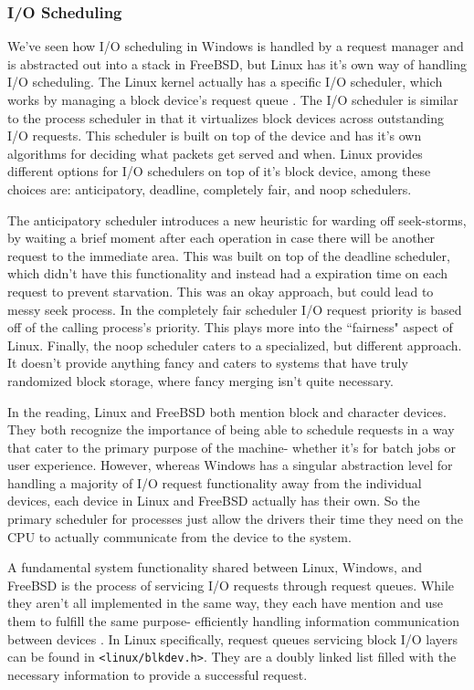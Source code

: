 \documentclass[10pt,draftclsnofoot,onecolumn]{IEEEtran}
\begin{document}
\subsubsection{I/O Scheduling}
\label{sub:IOScheduling Linux}
\par We've seen how I/O scheduling in Windows is handled by a request manager and is abstracted out into a stack in FreeBSD, but Linux has it's own way of handling I/O scheduling.
The Linux kernel actually has a specific I/O scheduler, which works by managing a block device's request queue \cite{linux:1}.
The I/O scheduler is similar to the process scheduler in that it virtualizes block devices across outstanding I/O requests.
This scheduler is built on top of the device and has it's own algorithms for deciding what packets get served and when.
Linux provides different options for I/O schedulers on top of it's block device, among these choices are: anticipatory, deadline, completely fair, and noop schedulers.

\par The anticipatory scheduler introduces a new heuristic for warding off seek-storms, by waiting a brief moment after each operation in case there will be another request to the immediate area.
This was built on top of the deadline scheduler, which didn't have this functionality and instead had a expiration time on each request to prevent starvation.
This was an okay approach, but could lead to messy seek process.
In the completely fair scheduler I/O request priority is based off of the calling process's priority.
This plays more into the ``fairness" aspect of Linux.
Finally, the noop scheduler caters to a specialized, but different approach.
It doesn't provide anything fancy and caters to systems that have truly randomized block storage, where fancy merging isn't quite necessary.

\par In the reading, Linux and FreeBSD both mention block and character devices.
They both recognize the importance of being able to schedule requests in a way that cater to the primary purpose of the machine- whether it's for batch jobs or user experience.
However, whereas Windows has a singular abstraction level for handling a majority of I/O request functionality away from the individual devices, each device in Linux and FreeBSD actually has their own.
So the primary scheduler for processes just allow the drivers their time they need on the CPU to actually communicate from the device to the system.

\par A fundamental system functionality shared between Linux, Windows, and FreeBSD is the process of servicing I/O requests through request queues.
While they aren't all implemented in the same way, they each have mention and use them to fulfill the same purpose- efficiently handling information communication between devices \cite{bsd:1} \cite{win:2} \cite{linux:1}.
In Linux specifically, request queues servicing block I/O layers can be found in \texttt{<linux/blkdev.h>}.
They are a doubly linked list filled with the necessary information to provide a successful request.
\end{document}
